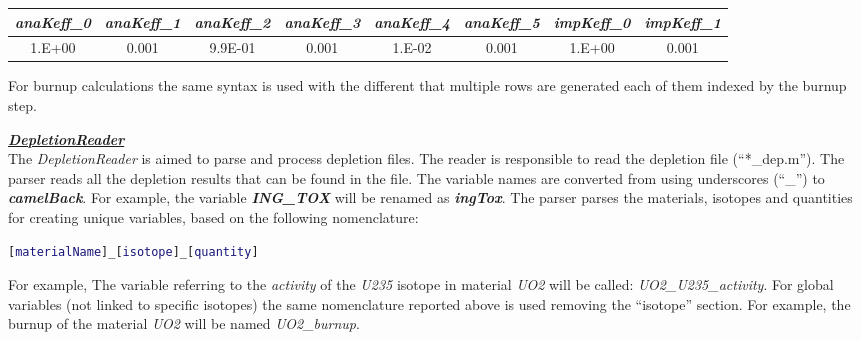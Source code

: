 \begin{table}[ht]
\begin{tabular}{|c|c|c|c|c|c|c|c|}
\hline
\textit{anaKeff\_0} & \textit{anaKeff\_1} & \textit{anaKeff\_2} & \textit{anaKeff\_3} & \textit{anaKeff\_4} & \textit{anaKeff\_5} & \textit{impKeff\_0} & \textit{impKeff\_1} \\ \hline
1.E+00              & 0.001               & 9.9E-01             & 0.001               & 1.E-02              & 0.001               & 1.E+00              & 0.001               \\ \hline
\end{tabular}
\end{table}

For burnup calculations the same syntax is used with the different that multiple rows are generated each of them indexed by the burnup step.

\textit{\textbf{\underline{DepletionReader}}}
\\The \textit{DepletionReader} is aimed to parse and process depletion files.
The reader is responsible to read the depletion file (``*\_dep.m'').
The parser reads all the depletion results that can
be found in the file.
The variable names are converted from using underscores (``\_'') to \textit{\textbf{camelBack}}. For example,
the variable \textit{\textbf{ING\_TOX}} will be renamed
 as \textit{\textbf{ingTox}}.
 The parser parses the materials, isotopes and quantities for creating unique variables, based on the following nomenclature:
  \begin{lstlisting}[language={matlab}]
   [materialName]_[isotope]_[quantity]
\end{lstlisting}
For example, The variable referring to the  \textit{activity}  of the  \textit{U235}  isotope in material  \textit{UO2} will be called:
\textit{UO2\_U235\_activity}.
For global variables (not linked to specific isotopes) the same nomenclature reported above is used removing the ``isotope'' section.
For example, the burnup of the material \textit{UO2} will be named \textit{UO2\_burnup}.

